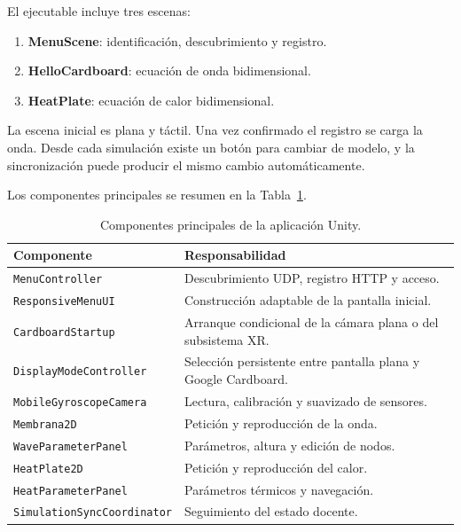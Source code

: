 El ejecutable incluye tres escenas:

\begin{enumerate}
    \item \textbf{MenuScene}: identificación, descubrimiento y registro.
    \item \textbf{HelloCardboard}: ecuación de onda bidimensional.
    \item \textbf{HeatPlate}: ecuación de calor bidimensional.
\end{enumerate}

La escena inicial es plana y táctil. Una vez confirmado el registro se carga la onda.
Desde cada simulación existe un botón para cambiar de modelo, y la sincronización puede
producir el mismo cambio automáticamente.

Los componentes principales se resumen en la Tabla~\ref{tab:componentes-unity}.

\begin{table}[H]
\centering
\caption{Componentes principales de la aplicación Unity.}
\label{tab:componentes-unity}
{\small
\begin{tabular}{ll}
\toprule
\parbox[t]{4.3cm}{\textbf{Componente}} & \parbox[t]{9.2cm}{\textbf{Responsabilidad}} \\
\midrule
\parbox[t]{4.3cm}{\texttt{MenuController}} & \parbox[t]{9.2cm}{Descubrimiento UDP, registro HTTP y acceso.} \\
\parbox[t]{4.3cm}{\texttt{ResponsiveMenuUI}} & \parbox[t]{9.2cm}{Construcción adaptable de la pantalla inicial.} \\
\parbox[t]{4.3cm}{\texttt{CardboardStartup}} & \parbox[t]{9.2cm}{Arranque condicional de la cámara plana o del subsistema XR.} \\
\parbox[t]{4.3cm}{\texttt{DisplayModeController}} & \parbox[t]{9.2cm}{Selección persistente entre pantalla plana y Google Cardboard.} \\
\parbox[t]{4.3cm}{\texttt{MobileGyroscopeCamera}} & \parbox[t]{9.2cm}{Lectura, calibración y suavizado de sensores.} \\
\parbox[t]{4.3cm}{\texttt{Membrana2D}} & \parbox[t]{9.2cm}{Petición y reproducción de la onda.} \\
\parbox[t]{4.3cm}{\texttt{WaveParameterPanel}} & \parbox[t]{9.2cm}{Parámetros, altura y edición de nodos.} \\
\parbox[t]{4.3cm}{\texttt{HeatPlate2D}} & \parbox[t]{9.2cm}{Petición y reproducción del calor.} \\
\parbox[t]{4.3cm}{\texttt{HeatParameterPanel}} & \parbox[t]{9.2cm}{Parámetros térmicos y navegación.} \\
\parbox[t]{4.3cm}{\raggedright\texttt{SimulationSync}\allowbreak\texttt{Coordinator}} & \parbox[t]{9.2cm}{Seguimiento del estado docente.} \\
\bottomrule
\end{tabular}}
\end{table}

